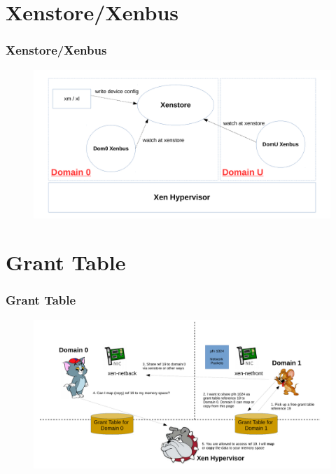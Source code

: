 \documentclass[aspectratio=169]{beamer}
\begin{document}

\section{Xenstore/Xenbus}
\begin{frame}
\frametitle{Xenstore/Xenbus}
\begin{figure}
\includegraphics[width=1.0\linewidth]{figures/xenstore.pdf}
\end{figure}
\end{frame}


\section{Grant Table}
\begin{frame}
\frametitle{Grant Table}
\begin{figure}
\includegraphics[width=1.0\linewidth]{figures/grant.pdf}
\end{figure}
\end{frame}

\end{document}
